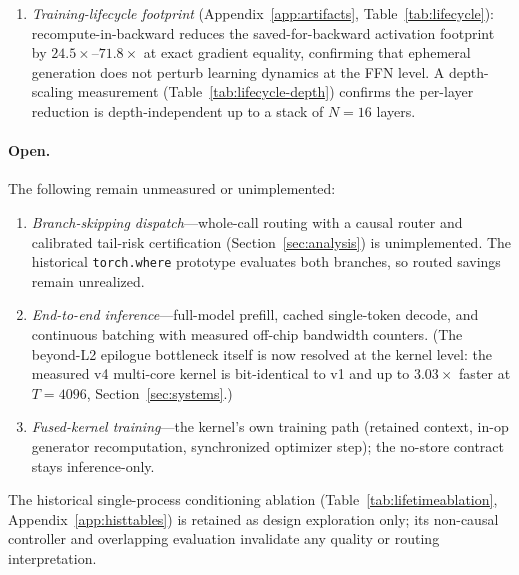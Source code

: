 \begin{enumerate}
    r384, r401, and r512, all rows from one coherent run family. The
    generated diagonal core reaches same-rank parity
    with the trained persistent control at every rank
    (rel.-MSE $0.449$ vs.\ $0.450$ at r384; $0.440$ vs.\ $0.439$ at r401;
    $0.382$ vs.\ $0.383$ at r512). At the near-equal-budget pair
    (persistent r401 at 48.2~MiB vs.\ causal r384 at 48.1~MiB) the
    persistent factor is better by $+1.95\%$ relative MSE---the honest
    equal-budget penalty for the generated arm at this scale.
    Static SVD is markedly worse at every rank ($0.837$ vs.\ $0.450$ at
    r384). A shuffled-context control (Table~\ref{tab:shuffled}) shows that
    context-conditioning contributes only ${\sim}0.05\%$ of MSE
    ($-0.00021$ paired at r384, not detectable at r512); most of the
    benefit comes from the trainable per-token correction itself. A
    rank-512 control (Table~\ref{tab:rank512control}) extends the result:
    same-rank parity persists at r512, while a persistent r512 factor
    beats the causal r384 core by $14.6\%$ relative MSE---capacity, not
    generation, dominates quality.
  \item \emph{Training-lifecycle footprint} (Appendix~\ref{app:artifacts},
    Table~\ref{tab:lifecycle}): recompute-in-backward reduces the
    saved-for-backward activation footprint by $24.5\times$--$71.8\times$
    at exact gradient equality, confirming that ephemeral generation does
    not perturb learning dynamics at the FFN level. A depth-scaling
    measurement (Table~\ref{tab:lifecycle-depth}) confirms the per-layer
    reduction is depth-independent up to a stack of $N{=}16$ layers.
\end{enumerate}

\paragraph{Open.}
The following remain unmeasured or unimplemented:
\begin{enumerate}
  \item \emph{Branch-skipping dispatch}---whole-call routing with a causal
    router and calibrated tail-risk certification
    (Section~\ref{sec:analysis}) is unimplemented. The historical
    \texttt{torch.where} prototype evaluates both branches, so routed
    savings remain unrealized.
  \item \emph{End-to-end inference}---full-model prefill, cached
    single-token decode, and continuous batching with measured off-chip
    bandwidth counters.  (The beyond-L2 epilogue bottleneck itself is now
    resolved at the kernel level: the measured v4 multi-core kernel is
    bit-identical to v1 and up to $3.03\times$ faster at $T{=}4096$,
    Section~\ref{sec:systems}.)
  \item \emph{Fused-kernel training}---the kernel's own training path
    (retained context, in-op generator recomputation, synchronized optimizer
    step); the no-store contract stays inference-only.
\end{enumerate}

The historical single-process conditioning ablation
(Table~\ref{tab:lifetimeablation}, Appendix~\ref{app:histtables}) is
retained as design exploration only; its non-causal controller and
overlapping evaluation invalidate any quality or routing interpretation.
